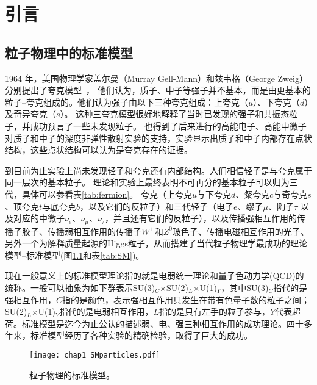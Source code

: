 \chapter{引言}
\label{chap:introduction}

\section{粒子物理中的标准模型}
1964 年，美国物理学家盖尔曼（Murray Gell-Mann）和兹韦格（George Zweig）分别提出了夸克模型~\cite{c1_qmodel_gell,c1_qmodel_Zweig}，
他们认为，质子、中子等强子并不基本，而是由更基本的粒子--夸克组成的。他们认为强子由以下三种夸克组成：上夸克（$u$）、下夸克（$d$）及奇异夸克（$s$）。
这种三夸克模型很好地解释了当时已发现的强子和共振态粒子，并成功预言了一些未发现粒子。 
也得到了后来进行的高能电子、高能中微子对质子和中子的深度非弹性散射实验的支持，实验显示出质子和中子内部存在点状结构，这些点状结构可以认为是夸克存在的证据。

到目前为止实验上尚未发现轻子和夸克还有内部结构。人们相信轻子是与夸克属于同一层次的基本粒子。
理论和实验上最终表明不可再分的基本粒子可以归为三代，具体可以参看表\ref{tab:fermion}。
夸克（上夸克$u$与下夸克$d$、粲夸克$c$与奇夸克$s$、顶夸克$t$与底夸克$b$，以及它们的反粒子）和三代轻子（电子$e$、缪子$\mu$、陶子$\tau$ 以及对应的中微子$\nu_e$、$\nu_{\mu}$、$\nu_{\tau}$，并且还有它们的反粒子），以及传播强相互作用的传播子胶子、传播弱相互作用的传播子$W^{\pm}$和$Z^0$玻色子、传播电磁相互作用的光子、另外一个为解释质量起源的Higgs粒子，从而搭建了当代粒子物理学最成功的理论模型--标准模型(图\ref{fig:SM}和表\ref{tab:SM})。

现在一般意义上的标准模型理论指的就是电弱统一理论和量子色动力学(QCD)的统称。一般可以抽象为如下群表示SU(3)$_{C}$$\times$SU(2)$_{L}$$\times$U(1)$_{Y}$，其中SU(3)$_{C}$指代的是强相互作用，$C$指的是颜色，表示强相互作用只发生在带有色量子数的粒子之间；SU(2)$_{L}$$\times$U(1)$_{Y}$指代的是电弱相互作用，$L$指的是只有左手的粒子参与，$Y$代表超荷。标准模型是迄今为止公认的描述弱、电、强三种相互作用的成功理论。四十多年来，标准模型经历了各种实验的精确检验，取得了巨大的成功。

\begin{figure}[!tbp]
 \centering
 \texttt{[image: chap1\_SMparticles.pdf]}
 \caption{粒子物理的标准模型。}
 \label{fig:SM}
\end{figure}

